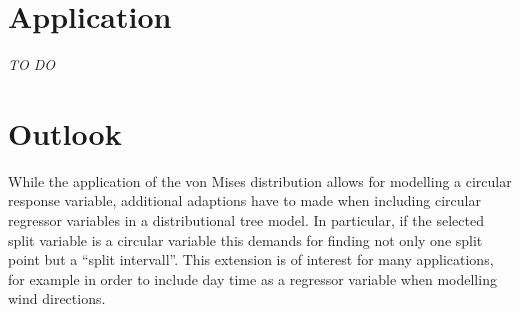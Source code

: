 \documentclass[twoside]{report}
\begin{document}



\section{Application}

\textit{TO DO}

\bigskip

\section{Outlook}

While the application of the von Mises distribution allows for modelling a circular response variable,
additional adaptions have to made when including circular regressor variables in a distributional tree
model. In particular, if the selected split variable is a circular variable this demands for finding
not only one split point but a ``split intervall''. This extension is of interest for many applications,
for example in order to include day time as a regressor variable when modelling wind directions.


\bigskip



\end{document}

